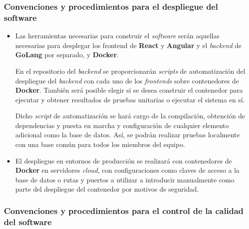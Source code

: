 \documentclass[11pt, a4paper, titlepage]{article}
\begin{document}
\subsubsection{Convenciones y procedimientos para el despliegue del software}

\begin{itemize}
    \item Las herramientas necesarias para construir el \textit{software} serán aquellas necesarias para desplegar los frontend de \textbf{React} y \textbf{Angular} y el \textit{backend} de \textbf{GoLang} por separado, y \textbf{Docker}. \newline
    
    En el repositorio del \textit{backend} se proporcionarán \textit{scripts} de automatización del despliegue del \textit{backend} con cada uno de los \textit{frontends} sobre contenedores de \textbf{Docker}. También será posible elegir si se desea construir el contenedor para ejecutar y obtener resultados de pruebas unitarias o ejecutar el sistema en sí. \newline
    
    Dicho \textit{script} de automatización se hará cargo de la compilación, obtención de dependencias y puesta en marcha y configuración de cualquier elemento adicional como la base de datos. Así, se podrán realizar pruebas localmente con una base común para todos los miembros del equipo.
    \item El despliegue en entornos de producción se realizará con contenedores de \textbf{Docker} en servidores \textit{cloud}, con configuraciones como claves de acceso a la base de datos o rutas y puertos a utilizar a introducir manualmente como parte del despliegue del contenedor por motivos de seguridad.
\end{itemize}

\subsubsection{Convenciones y procedimientos para el control de la calidad del software}
\end{document}

